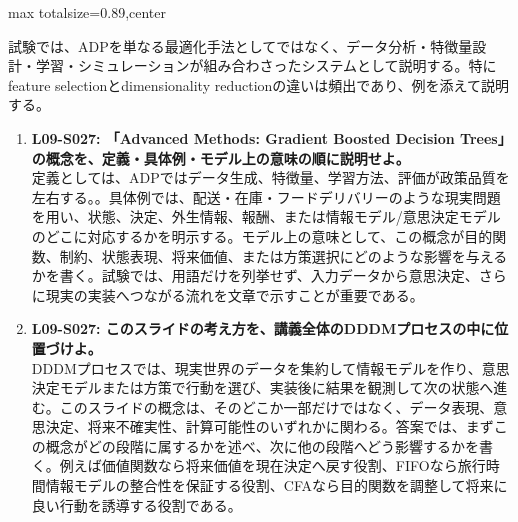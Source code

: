 \begin{minipage}[t]{0.58\textwidth}
\begin{adjustbox}{max totalsize={\textwidth}{0.89\textheight},center}
\begin{minipage}{\textwidth}
試験では、ADPを単なる最適化手法としてではなく、データ分析・特徴量設計・学習・シミュレーションが組み合わさったシステムとして説明する。特にfeature selectionとdimensionality reductionの違いは頻出であり、例を添えて説明する。\par{}\begin{enumerate}\item \textbf{L09-S027: 「Advanced Methods: Gradient Boosted Decision Trees」の概念を、定義・具体例・モデル上の意味の順に説明せよ。}\\定義としては、ADPではデータ生成、特徴量、学習方法、評価が政策品質を左右する。。具体例では、配送・在庫・フードデリバリーのような現実問題を用い、状態、決定、外生情報、報酬、または情報モデル/意思決定モデルのどこに対応するかを明示する。モデル上の意味として、この概念が目的関数、制約、状態表現、将来価値、または方策選択にどのような影響を与えるかを書く。試験では、用語だけを列挙せず、入力データから意思決定、さらに現実の実装へつながる流れを文章で示すことが重要である。\item \textbf{L09-S027: このスライドの考え方を、講義全体のDDDMプロセスの中に位置づけよ。}\\DDDMプロセスでは、現実世界のデータを集約して情報モデルを作り、意思決定モデルまたは方策で行動を選び、実装後に結果を観測して次の状態へ進む。このスライドの概念は、そのどこか一部だけではなく、データ表現、意思決定、将来不確実性、計算可能性のいずれかに関わる。答案では、まずこの概念がどの段階に属するかを述べ、次に他の段階へどう影響するかを書く。例えば価値関数なら将来価値を現在決定へ戻す役割、FIFOなら旅行時間情報モデルの整合性を保証する役割、CFAなら目的関数を調整して将来に良い行動を誘導する役割である。\end{enumerate}
\end{minipage}
\end{adjustbox}
\end{minipage}


